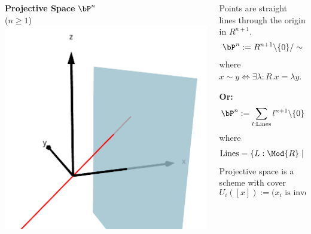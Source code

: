 \documentclass{beamer}
\begin{document}
\begin{frame}
  \begin{columns}
    \begin{column}{0.5\textwidth}
      \textbf{Projective Space} $\bP^n$ \\
      \pause
      ($n\geq 1$)
      \vspace{4mm}
      \pause
      \includegraphics[width=\textwidth]{projective-space.png}
      \vspace{2cm}
    \end{column}
    
    \begin{column}{0.5\textwidth}
      \pause
      Points are straight lines through the origin in $R^{n+1}$.
      \[ \bP^n:= R^{n+1}\text{\textbackslash}\{0\}/\sim \]
      where $x\sim y \Leftrightarrow \exists \lambda :R. x=\lambda y$. 

      \vspace{1em}
      \pause
      \textbf{Or:}
      \[ \bP^n:= \sum_{l:\mathrm{Lines}}l^{n+1}\text{\textbackslash}\{0\} \]
      where
      \[\mathrm{Lines}=\{L:\Mod{R}\mid \|L=R^1\|\}\]
      \pause
      Projective space is a scheme with cover
      \[ U_i([x]) := \text{($x_i$ is invertible)}. \]      
    \end{column}
  \end{columns}
\end{frame}
\end{document}
